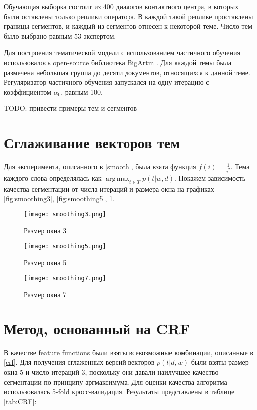 \documentclass[pdftex,ptm,12pt,a4paper]{report}
\theoremstyle{definition}
\DeclareMathOperator*{\argmax}{arg\,max}
\begin{document}
Обучающая выборка состоит из 400 диалогов контактного центра, в которых были оставлены только реплики оператора. В каждой такой реплике проставлены границы сегментов, и каждый из сегментов отнесен к некоторой теме. Число тем было выбрано равным 53 экспертом. 

Для построения тематической модели с использованием частичного обучения использовалось open-source библиотека BigArtm \cite{bigartm}. Для каждой темы была размечена небольшая группа до десяти документов, относящихся к данной теме. Регуляризатор частичного обучения запускался на одну итерацию с коэффициентом $\alpha_0$, равным 100. 

TODO: привести примеры тем и сегментов

\section{Сглаживание векторов тем}

Для эксперимента, описанного в \ref{smooth}, была взята функция $f(i) = \frac{1}{i^2}$. Тема каждого слова определялась как $\argmax_{t\in T}p(t|w,d)$.  Покажем зависимость качества сегментации от числа итераций и размера окна на графиках \ref{fig:smoothing3}, \ref{fig:smoothing5}, \ref{fig:smoothing7}.
 
\begin{figure}
	\begin{center}
		\texttt{[image: smoothing3.png]}
		\caption{Размер окна 3}
		\label{fig:smoothing3}
		\texttt{[image: smoothing5.png]}
		\caption{Размер окна 5}
		\label{fig:smoothing5}
		\texttt{[image: smoothing7.png]}
		\caption{Размер окна 7}
		\label{fig:smoothing7}
		
	\end{center}
\end{figure}


\section{Метод, основанный на CRF}

В качестве feature functions были взяты всевозможные комбинации, описанные в \ref{crf}. Для получения сглаженных версий векторов $p(t|d,w)$ были взяты размер окна 5 и число итераций 3, поскольку они давали наилучшее качество сегментации по принципу аргмаксимума. Для оценки качества алгоритма использовалась 5-fold кросс-валидация.
Результаты представлены в таблице \ref{tab:CRF}:
\end{document}
